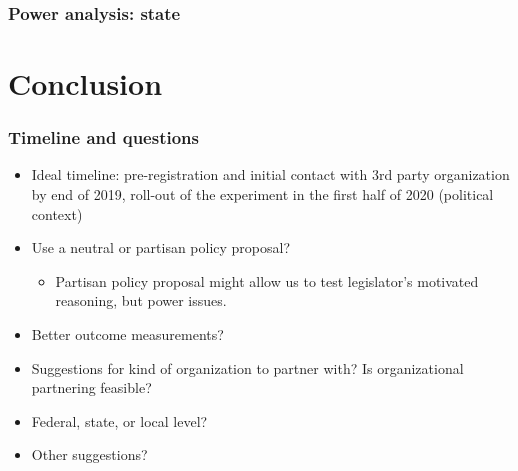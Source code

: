\documentclass[usenames,dvipsnames]{beamer}
\begin{document}
\begin{frame}
\frametitle{Power analysis: state}


\end{frame}




\section{Conclusion}

\begin{frame}
\frametitle{Timeline and questions}
\begin{itemize}
\item \textcolor{Cerulean}{Ideal timeline}: pre-registration and initial contact with 3rd party organization by end of 2019, roll-out of the experiment in the first half of 2020 (political context)
\item Use a \textcolor{Cerulean}{neutral or partisan policy} proposal?
\begin{itemize}
\item Partisan policy proposal might allow us to test legislator's motivated reasoning, but power issues.
\end{itemize}
\item Better \textcolor{Cerulean}{outcome measurements}?
\item Suggestions for kind of \textcolor{Cerulean}{organization to partner with}? Is organizational partnering feasible?
\item Federal, state, or local level?
\item Other suggestions?
\end{itemize}

\end{frame}
\end{document}
